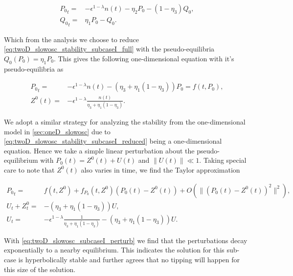 \begin{equation}\label{eq:twoD_slowosc_stability_subcaseI_full}
\begin{aligned}
{P_0}_t =& -\epsilon^{1-\lambda} n(t)-\eta_2 P_0 -(1-\eta_3)Q_0,\\
{Q_0}_t =& \eta_1 P_0 - Q_0.
\end{aligned}
\end{equation}

Which from the analysis we choose to reduce \eqref{eq:twoD_slowosc_stability_subcaseI_full} with the pseudo-equilibria $Q_0(P_0)=\eta_1 P_0$. This gives the following one-dimensional equation with it's pseudo-equilibria as 

\begin{equation}\label{eq:twoD_slowosc_stability_subcaseI_reduced}
\begin{aligned}
{P_0}_t =& -\epsilon^{1-\lambda}n(t)-(\eta_3+\eta_1(1-\eta_3))P_0=f(t,P_0),\\ Z^0(t) =& -\epsilon^{1-\lambda}\frac{n(t)}{\eta_3+\eta_1(1-\eta_3)}.
\end{aligned}
\end{equation}

We adopt a similar strategy for analyzing the stability from the one-dimensional model in \autoref{sec:oneD_slowosc} due to \eqref{eq:twoD_slowosc_stability_subcaseI_reduced} being a one-dimensional equation. Hence we take a simple linear perturbation about the pseudo-equilibrium with $P_0(t)=Z^0(t)+U(t)$ and $\lVert U(t)\rVert \ll 1$. Taking special care to note that $Z^0(t)$ also varies in time, we find the Taylor approximation

\begin{equation}\label{eq:twoD_slowosc_subcaseI_perturb}
\begin{aligned}
{P_0}_t=&f(t,Z^0) +f_{P_0}(t,Z^0)(P_0(t)-Z^0(t))+O(\lVert (P_0(t)-Z^0(t))^2\rVert^2),\\
U_t+Z^0_t =& -(\eta_3+\eta_1(1-\eta_3))U,\\
U_t =& -\epsilon^{1-\lambda}\frac{1}{\eta_3+\eta_1(1-\eta_3)}-(\eta_3+\eta_1(1-\eta_3))U.
\end{aligned}
\end{equation}

With \eqref{eq:twoD_slowosc_subcaseI_perturb} we find that the perturbations decay exponentially to a nearby equilibrium. This indicates the solution for this sub-case is hyperbolically stable and further agrees that no tipping will happen for this size of the solution.

